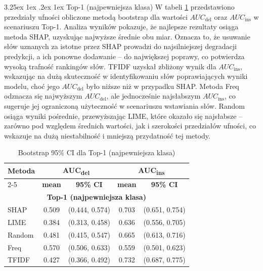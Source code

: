 \documentclass[wmii, inf, mgr]{uwmthesis}
\makeatletter
\renewcommand\paragraph{\@startsection{paragraph}{4}{\z@}%
  {3.25ex \@plus1ex \@minus.2ex}%
  {1ex}%
  {\normalfont\normalsize\bfseries}}
\makeatother
\begin{document}
\paragraph{Top-1 (najpewniejsza klasa)}
W tabeli \ref{tab:ci_top1} przedstawiono przedziały ufności obliczone metodą bootstrap dla wartości $AUC_{\text{del}}$ oraz $AUC_{\text{ins}}$ w scenariuszu Top-1. Analiza wyników pokazuje, że najlepsze rezultaty osiąga metoda SHAP, uzyskując najwyższe średnie obu miar. Oznacza to, że usuwanie słów uznanych za istotne przez SHAP prowadzi do najsilniejszej degradacji predykcji, a ich ponowne dodawanie -- do największej poprawy, co potwierdza wysoką trafność rankingów słów. TFIDF uzyskał zbliżony wynik dla $AUC_{\text{ins}}$, wskazując na dużą skuteczność w identyfikowaniu słów poprawiających wyniki modelu, choć jego $AUC_{\text{del}}$ było niższe niż w przypadku SHAP. Metoda Freq odznacza się najwyższym $AUC_{\text{del}}$, ale jednocześnie najsłabszym $AUC_{\text{ins}}$, co sugeruje jej ograniczoną użyteczność w scenariuszu wstawiania słów. Random osiąga wyniki pośrednie, przewyższając LIME, które okazało się najsłabsze -- zarówno pod względem średnich wartości, jak i szerokości przedziałów ufności, co wskazuje na dużą niestabilność i mniejszą przydatność tej metody.

\begin{table}[H]
	\centering
	\renewcommand{\arraystretch}{1.3}
	\begin{tabular}{|l|c|c|c|c|}
		\hline
		\textbf{Metoda} & \multicolumn{2}{c|}{\textbf{AUC\textsubscript{del}}} & \multicolumn{2}{c|}{\textbf{AUC\textsubscript{ins}}} \\ \cline{2-5}
		& \textbf{mean} & \textbf{95\% CI} & \textbf{mean} & \textbf{95\% CI} \\ \hline
		\multicolumn{5}{|c|}{\textbf{Top-1 (najpewniejsza klasa)}} \\ \hline
		SHAP   & 0.509 & (0.444, 0.574) & 0.703 & (0.651, 0.754) \\ \hline
		LIME   & 0.384 & (0.313, 0.458) & 0.636 & (0.556, 0.705) \\ \hline
		Random & 0.481 & (0.415, 0.547) & 0.665 & (0.613, 0.716) \\ \hline
		Freq   & 0.570 & (0.506, 0.633) & 0.559 & (0.501, 0.623) \\ \hline
		TFIDF  & 0.427 & (0.366, 0.492) & 0.732 & (0.687, 0.775) \\ \hline
	\end{tabular}
	\caption{Bootstrap 95\% CI dla Top-1 (najpewniejsza klasa)}
	\label{tab:ci_top1}
\end{table}
\end{document}
